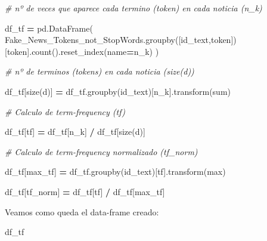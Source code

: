 \documentclass[
  11pt,
  a4paper,
]{article}
\newenvironment{Shaded}{\begin{snugshade}}{\end{snugshade}}
\newcommand{\BuiltInTok}[1]{#1}
\newcommand{\CommentTok}[1]{\textcolor[rgb]{0.56,0.35,0.01}{\textit{#1}}}
\newcommand{\NormalTok}[1]{#1}
\newcommand{\OperatorTok}[1]{\textcolor[rgb]{0.81,0.36,0.00}{\textbf{#1}}}
\newcommand{\StringTok}[1]{\textcolor[rgb]{0.31,0.60,0.02}{#1}}
\begin{document}
\begin{Shaded}
\begin{Highlighting}[]
\CommentTok{\# nº de veces que aparece cada termino (token) en cada noticia (n\_k)}

\NormalTok{df\_tf }\OperatorTok{=}\NormalTok{ pd.DataFrame( Fake\_News\_Tokens\_not\_StopWords.groupby([}\StringTok{\textquotesingle{}id\_text\textquotesingle{}}\NormalTok{,}\StringTok{\textquotesingle{}token\textquotesingle{}}\NormalTok{])[}\StringTok{\textquotesingle{}token\textquotesingle{}}\NormalTok{].count().reset\_index(name}\OperatorTok{=}\StringTok{\textquotesingle{}n\_k\textquotesingle{}}\NormalTok{) )}

\CommentTok{\# nº de terminos (tokens) en cada noticia (size(d))}

\NormalTok{df\_tf[}\StringTok{\textquotesingle{}size(d)\textquotesingle{}}\NormalTok{] }\OperatorTok{=}\NormalTok{ df\_tf.groupby(}\StringTok{\textquotesingle{}id\_text\textquotesingle{}}\NormalTok{)[}\StringTok{\textquotesingle{}n\_k\textquotesingle{}}\NormalTok{].transform(}\BuiltInTok{sum}\NormalTok{)}

\CommentTok{\# Calculo de term{-}frequency (tf)}

\NormalTok{df\_tf[}\StringTok{\textquotesingle{}tf\textquotesingle{}}\NormalTok{] }\OperatorTok{=}\NormalTok{ df\_tf[}\StringTok{\textquotesingle{}n\_k\textquotesingle{}}\NormalTok{] }\OperatorTok{/}\NormalTok{ df\_tf[}\StringTok{\textquotesingle{}size(d)\textquotesingle{}}\NormalTok{]}


\CommentTok{\# Calculo de term{-}frequency normalizado (tf\_norm)}

\NormalTok{df\_tf[}\StringTok{\textquotesingle{}max\_tf\textquotesingle{}}\NormalTok{] }\OperatorTok{=}\NormalTok{ df\_tf.groupby(}\StringTok{\textquotesingle{}id\_text\textquotesingle{}}\NormalTok{)[}\StringTok{\textquotesingle{}tf\textquotesingle{}}\NormalTok{].transform(}\BuiltInTok{max}\NormalTok{)}

\NormalTok{df\_tf[}\StringTok{\textquotesingle{}tf\_norm\textquotesingle{}}\NormalTok{] }\OperatorTok{=}\NormalTok{ df\_tf[}\StringTok{\textquotesingle{}tf\textquotesingle{}}\NormalTok{] }\OperatorTok{/}\NormalTok{ df\_tf[}\StringTok{\textquotesingle{}max\_tf\textquotesingle{}}\NormalTok{]}
\end{Highlighting}
\end{Shaded}

Veamos como queda el data-frame creado:

\begin{Shaded}
\begin{Highlighting}[]
\NormalTok{df\_tf}
\end{Highlighting}
\end{Shaded}
\end{document}
